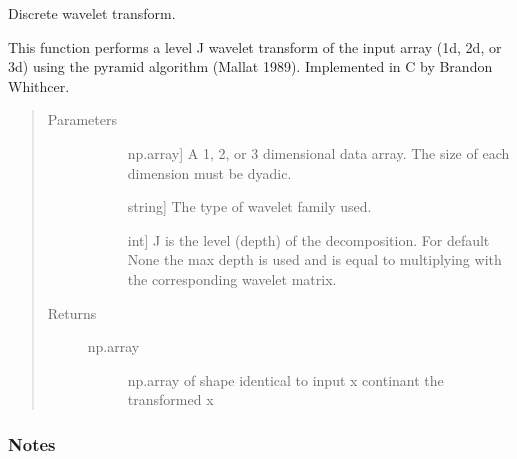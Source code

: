 \documentclass[letterpaper,10pt,english]{sphinxmanual}
\begin{document}

\begin{fulllineitems}
\label{\detokenize{pysmme:pysmme.transforms.wt}}
\sphinxAtStartPar
Discrete wavelet transform.

\sphinxAtStartPar
This function performs a level J wavelet transform of the input array (1d, 2d, or 3d) 
using the pyramid algorithm (Mallat 1989). Implemented in C by Brandon Whithcer.
\begin{quote}\begin{description}
\item[{Parameters}] \leavevmode\begin{description}
\item[{}] \leavevmode{[}np.array{]}
\sphinxAtStartPar
A 1, 2, or 3 dimensional data array. The size of each dimension must be dyadic.

\item[{}] \leavevmode{[}string{]}
\sphinxAtStartPar
The type of wavelet family used.

\item[{}] \leavevmode{[}int{]}
\sphinxAtStartPar
J is the level (depth) of the decomposition. For default None the max
depth is used and   is equal to multiplying  with the
corresponding wavelet matrix.

\end{description}

\item[{Returns}] \leavevmode\begin{description}
\item[{np.array}] \leavevmode
\sphinxAtStartPar
np.array of shape identical to input x continant the transformed x

\end{description}

\end{description}\end{quote}
\subsubsection*{Notes}


\end{fulllineitems}
\end{document}
